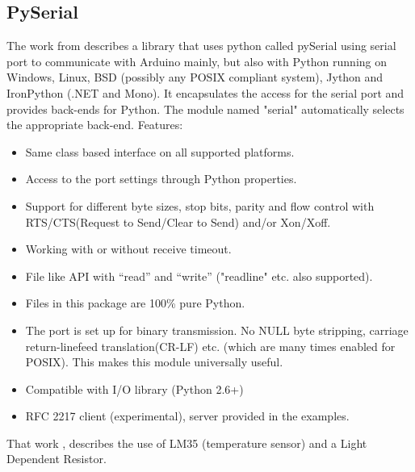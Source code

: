 \documentclass{acm_proc_article-sp}
\begin{document}
\subsection{PySerial}
The work from \cite{dearduino} describes a library that uses python called pySerial using serial port to communicate with Arduino mainly, but also with Python running on Windows, Linux, BSD (possibly any POSIX compliant system), Jython and IronPython (.NET and Mono). It encapsulates the access for the serial port and provides back-ends for Python. The module named "serial" automatically selects the appropriate back-end.
\newline
\newline
Features:
\begin{itemize}
\item Same class based interface on all supported platforms.
\item Access to the port settings through Python properties.
\item Support for different byte sizes, stop bits, parity and flow control with RTS/CTS(Request to Send/Clear to Send) and/or Xon/Xoff.
\item Working with or without receive timeout.
\item File like API with “read” and “write” ("readline" etc. also supported).
\item Files in this package are 100\% pure Python.
\item The port is set up for binary transmission. No NULL byte stripping, carriage return-linefeed translation(CR-LF) etc. (which are many times enabled for POSIX). This makes this module universally useful.
\item Compatible with I/O library (Python 2.6+)
\item RFC 2217 client (experimental), server provided in the examples.
\end{itemize}

That work \cite{dearduino}, describes the use of LM35 (temperature sensor) and a Light Dependent Resistor.
\newline
\newline
\end{document}
